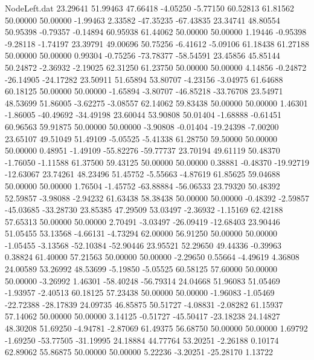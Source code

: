\begin{filecontents}{NodeLeft.dat}
  23.29641   51.99463   47.66418    -4.05250   -5.77150   60.52813   61.81562   50.00000   50.00000   -1.99463    2.33582  -47.35235  -67.43835
  23.34741   48.80554   50.95398    -0.79357   -0.14894   60.95938   61.44062   50.00000   50.00000    1.19446   -0.95398   -9.28118   -1.74197
  23.39791   49.00696   50.75256    -6.41612   -5.09106   61.18438   61.27188   50.00000   50.00000    0.99304   -0.75256  -73.78377  -58.54591
  23.45856   45.85144   50.24872    -2.36932   -2.19025   62.31250   61.23750   50.00000   50.00000    4.14856   -0.24872  -26.14905  -24.17282
  23.50911   51.65894   53.80707    -4.23156   -3.04975   61.64688   60.18125   50.00000   50.00000   -1.65894   -3.80707  -46.85218  -33.76708
  23.54971   48.53699   51.86005    -3.62275   -3.08557   62.14062   59.83438   50.00000   50.00000    1.46301   -1.86005  -40.49692  -34.49198
  23.60044   53.90808   50.01404    -1.68888   -0.61451   60.96563   59.91875   50.00000   50.00000   -3.90808   -0.01404  -19.24398   -7.00200
  23.65107   49.51049   51.49109    -5.05525   -5.41338   61.28750   59.50000   50.00000   50.00000    0.48951   -1.49109  -55.82276  -59.77737
  23.70194   49.61119   50.48370    -1.76050   -1.11588   61.37500   59.43125   50.00000   50.00000    0.38881   -0.48370  -19.92719  -12.63067
  23.74261   48.23496   51.45752    -5.55663   -4.87619   61.85625   59.04688   50.00000   50.00000    1.76504   -1.45752  -63.88884  -56.06533
  23.79320   50.48392   52.59857    -3.98088   -2.94232   61.63438   58.38438   50.00000   50.00000   -0.48392   -2.59857  -45.03685  -33.28730
  23.85385   47.29509   53.03497    -2.36932   -1.15169   62.42188   57.65313   50.00000   50.00000    2.70491   -3.03497  -26.09419  -12.68403
  23.90446   51.05455   53.13568    -4.66131   -4.73294   62.00000   56.91250   50.00000   50.00000   -1.05455   -3.13568  -52.10384  -52.90446
  23.95521   52.29650   49.44336    -0.39963    0.38824   61.40000   57.21563   50.00000   50.00000   -2.29650    0.55664   -4.49619    4.36808
  24.00589   53.26992   48.53699    -5.19850   -5.05525   60.58125   57.60000   50.00000   50.00000   -3.26992    1.46301  -58.40248  -56.79314
  24.04668   51.96083   51.05469    -1.93957   -2.40513   60.18125   57.23438   50.00000   50.00000   -1.96083   -1.05469  -22.72388  -28.17839
  24.09735   46.85875   50.51727    -4.08831   -2.08282   61.15937   57.14062   50.00000   50.00000    3.14125   -0.51727  -45.50417  -23.18238
  24.14827   48.30208   51.69250    -4.94781   -2.87069   61.49375   56.68750   50.00000   50.00000    1.69792   -1.69250  -53.77505  -31.19995
  24.18884   44.77764   53.20251    -2.26188    0.10174   62.89062   55.86875   50.00000   50.00000    5.22236   -3.20251  -25.28170    1.13722

\end{filecontents}
